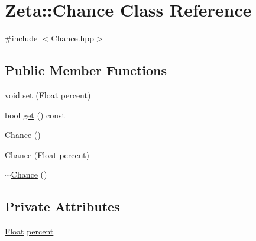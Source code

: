 \hypertarget{classZeta_1_1Chance}{\section{Zeta\+:\+:Chance Class Reference}
\label{classZeta_1_1Chance}
}


{\ttfamily \#include $<$Chance.\+hpp$>$}

\subsection*{Public Member Functions}
\begin{DoxyCompactItemize}
\item 
void \hyperlink{classZeta_1_1Chance_a97ca6263cbad55db4bd29a0b675c67fa}{set} (\hyperlink{namespaceZeta_a1e0a1265f9b3bd3075fb0fabd39088ba}{Float} \hyperlink{classZeta_1_1Chance_aa64e6fa1fe4642f0fd72018cfe820fd3}{percent})
\item 
bool \hyperlink{classZeta_1_1Chance_a647d1eada73f1a9af7cd6f2d2ab28bdf}{get} () const 
\item 
\hyperlink{classZeta_1_1Chance_a8f5af96177635578c6510b6121ad5689}{Chance} ()
\item 
\hyperlink{classZeta_1_1Chance_ac9edc11f1d124d71c622843531a2640d}{Chance} (\hyperlink{namespaceZeta_a1e0a1265f9b3bd3075fb0fabd39088ba}{Float} \hyperlink{classZeta_1_1Chance_aa64e6fa1fe4642f0fd72018cfe820fd3}{percent})
\item 
\hyperlink{classZeta_1_1Chance_aeb8dbfb061c095015308d745dab549e3}{$\sim$\+Chance} ()
\end{DoxyCompactItemize}
\subsection*{Private Attributes}
\begin{DoxyCompactItemize}
\item 
\hyperlink{namespaceZeta_a1e0a1265f9b3bd3075fb0fabd39088ba}{Float} \hyperlink{classZeta_1_1Chance_aa64e6fa1fe4642f0fd72018cfe820fd3}{percent}
\end{DoxyCompactItemize}


